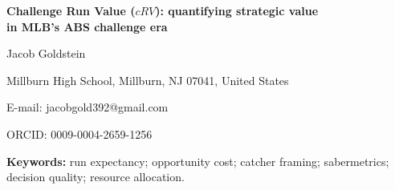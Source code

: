 \documentclass[12pt]{article}
\begin{document}
\begin{titlepage}
  \begin{center}
    \vspace*{1.5in}
    {\LARGE\bfseries Challenge Run Value ($cRV$): quantifying strategic value\\[0.5em]
     in MLB's ABS challenge era\par}
    \vfill
    {\Large Jacob Goldstein\par}
    \vspace{0.75em}
    {\large Millburn High School, Millburn, NJ 07041, United States\par}
    \vspace{0.75em}
    {\normalsize E-mail: jacobgold392@gmail.com\par}
    {\normalsize ORCID: 0009-0004-2659-1256\par}
    \vspace*{1.5in}
  \end{center}
\end{titlepage}

\newpage

\begin{abstract}
\noindent

\end{abstract}

\vspace{1em}
\noindent\textbf{Keywords:} run expectancy; opportunity cost; catcher framing;
sabermetrics; decision quality; resource allocation.

\newpage







\end{document}
